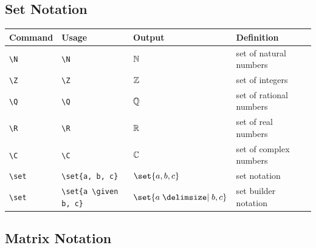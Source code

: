 \documentclass[11pt]{article}
\begin{document}
\subsection{Set Notation}

\begin{tabular}{llll}
    Command     & Usage                      & Output                & Definition              \\
    \hline
    \verb|\N|   & \verb|\N|                  & $\mathbb{N}$                  & set of natural numbers  \\
    \verb|\Z|   & \verb|\Z|                  & $\mathbb{Z}$                  & set of integers         \\
    \verb|\Q|   & \verb|\Q|                  & $\mathbb{Q}$                  & set of rational numbers \\
    \verb|\R|   & \verb|\R|                  & $\mathbb{R}$                  & set of real numbers     \\
    \verb|\C|   & \verb|\C|                  & $\mathbb{C}$                  & set of complex numbers  \\
    \verb|\set| & \verb|\set{a, b, c}|       & $\set{a, b, c}$       & set notation            \\
    \verb|\set| & \verb|\set{a \given b, c}| & $\set{a \given b, c}$ & set builder notation    \\
\end{tabular}

\subsection{Matrix Notation}
\end{document}
